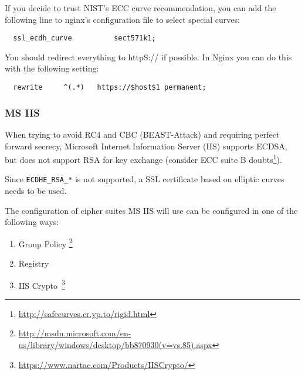 

If you decide to trust NIST's ECC curve recommendation, you can add the following line to nginx's configuration file to select special curves:

\begin{verbatim}
  ssl_ecdh_curve          sect571k1;
\end{verbatim}

You should redirect everything to httpS:// if possible. In Nginx you can do this with the following setting:

\begin{verbatim}
  rewrite     ^(.*)   https://$host$1 permanent;
\end{verbatim}



\subsubsection{MS IIS}
\label{sec:ms-iis}



When trying to avoid RC4 and CBC (BEAST-Attack) and requiring perfect
forward secrecy, Microsoft Internet Information Server (IIS) supports
ECDSA, but does not support RSA for key exchange (consider ECC suite
B doubts\footnote{\url{http://safecurves.cr.yp.to/rigid.html}}).

Since \verb|ECDHE_RSA_*| is not supported, a SSL certificate based on
elliptic curves needs to be used.

The configuration of cipher suites MS IIS will use can be configured in one
of the following ways:
\begin{enumerate}
\item Group Policy \footnote{\url{http://msdn.microsoft.com/en-us/library/windows/desktop/bb870930(v=vs.85).aspx}}
\item Registry
\item IIS Crypto~\footnote{\url{https://www.nartac.com/Products/IISCrypto/}}
\end{enumerate}


